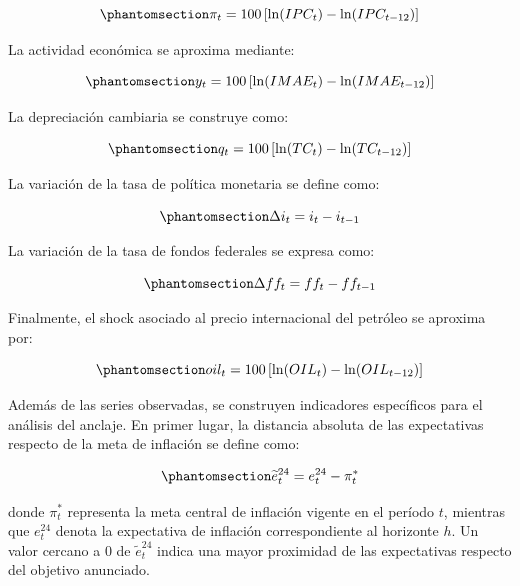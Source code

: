 \documentclass[
  10.5pt,
  letterpaper,
  twocolumn]{article}
\begin{document}
\begin{equation}\phantomsection\label{eq-inflacion}{
\pi_t = 100 \left[\ln(IPC_t)-\ln(IPC_{t-12})\right]
}\end{equation}

La actividad económica se aproxima mediante:

\begin{equation}\phantomsection\label{eq-imae}{
y_t = 100 \left[\ln(IMAE_t)-\ln(IMAE_{t-12})\right]
}\end{equation}

La depreciación cambiaria se construye como:

\begin{equation}\phantomsection\label{eq-tc}{
q_t = 100 \left[\ln(TC_t)-\ln(TC_{t-12})\right]
}\end{equation}

La variación de la tasa de política monetaria se define como:

\begin{equation}\phantomsection\label{eq-delta-i}{
\Delta i_t = i_t - i_{t-1}
}\end{equation}

La variación de la tasa de fondos federales se expresa como:

\begin{equation}\phantomsection\label{eq-delta-ff}{
\Delta ff_t = ff_t - ff_{t-1}
}\end{equation}

Finalmente, el shock asociado al precio internacional del petróleo se
aproxima por:

\begin{equation}\phantomsection\label{eq-oil}{
oil_t = 100 \left[\ln(OIL_t)-\ln(OIL_{t-12})\right]
}\end{equation}

Además de las series observadas, se construyen indicadores específicos
para el análisis del anclaje. En primer lugar, la distancia absoluta de
las expectativas respecto de la meta de inflación se define como:

\begin{equation}\phantomsection\label{eq-gap-exp24}{\widetilde e^{24}_t=e^{24}_t-\pi_t^*}\end{equation}

donde \(\pi_t^{*}\) representa la meta central de inflación vigente en
el período \(t\), mientras que \(e^{24}_t\) denota la expectativa de
inflación correspondiente al horizonte \(h\). Un valor cercano a 0 de
\(\widetilde e^{24}_t\) indica una mayor proximidad de las expectativas
respecto del objetivo anunciado.
\end{document}
